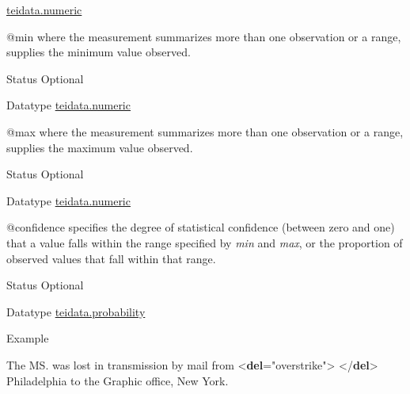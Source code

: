 \begin{reflist}
\begin{sansreflist}
\begin{reflist}
  \hyperref[TEI.teidata.numeric]{teidata.numeric}
\end{reflist}  
    \item[@min]
  where the measurement summarizes more than one observation or a range, supplies the minimum value observed.
\begin{reflist}
    \item[{Status}]
  Optional
    \item[{Datatype}]
  \hyperref[TEI.teidata.numeric]{teidata.numeric}
\end{reflist}  
    \item[@max]
  where the measurement summarizes more than one observation or a range, supplies the maximum value observed.
\begin{reflist}
    \item[{Status}]
  Optional
    \item[{Datatype}]
  \hyperref[TEI.teidata.numeric]{teidata.numeric}
\end{reflist}  
    \item[@confidence]
  specifies the degree of statistical confidence (between zero and one) that a value falls within the range specified by {\itshape min} and {\itshape max}, or the proportion of observed values that fall within that range.
\begin{reflist}
    \item[{Status}]
  Optional
    \item[{Datatype}]
  \hyperref[TEI.teidata.probability]{teidata.probability}
\end{reflist}  
\end{sansreflist}  
    \item[{Example}]
  \leavevmode\bgroup{}\exampleFont \begin{shaded}\noindent\mbox{}The MS. was lost in transmission by mail from {<\textbf{del}\hspace*{1em}{rend}="{overstrike}">}\mbox{}\newline 
{}\mbox{}\newline 
{</\textbf{del}>} Philadelphia to the Graphic office, New York.\mbox{}\newline 
\end{shaded}\egroup 


\end{reflist}  
